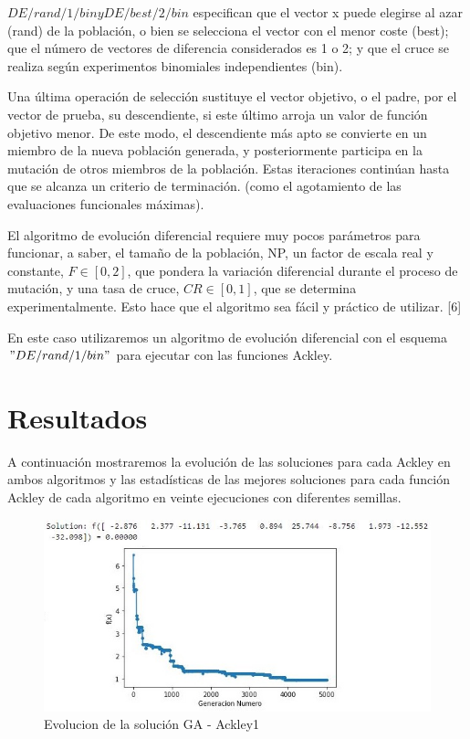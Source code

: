 \documentclass[10pt]{article}
\begin{document}
$ DE/rand/1/bin y DE/best/2/bin $ especifican que el vector x puede elegirse al azar (rand) de la población, o bien se selecciona el vector con el menor coste (best); que el número de vectores de diferencia considerados es 1 o 2; y que el cruce se realiza según experimentos binomiales independientes (bin).

Una última operación de selección sustituye el vector objetivo, o el padre, por el vector de prueba, su descendiente, si este último arroja un valor de función objetivo menor. De este modo, el descendiente más apto se convierte en un miembro de la nueva población generada, y posteriormente participa en la mutación de otros miembros de la población. Estas iteraciones continúan hasta que se alcanza un criterio de terminación. (como el agotamiento de las evaluaciones funcionales máximas).

El algoritmo de evolución diferencial requiere muy pocos parámetros para funcionar, a saber, el tamaño de la población, NP, un factor de escala real y constante, $F \in [0, 2] $, que pondera la variación diferencial durante el proceso de mutación, y una tasa de cruce, $ CR \in  [0, 1]$, que se determina experimentalmente. Esto hace que el algoritmo sea fácil y práctico de utilizar. [6]

En este caso utilizaremos un algoritmo de evolución diferencial con el esquema $ " DE/rand/1/bin " $ para ejecutar con las funciones Ackley.

\section{Resultados}%
A continuación mostraremos la evolución de las soluciones para cada Ackley en ambos algoritmos y las estadísticas de las mejores soluciones para cada función Ackley de cada algoritmo en veinte ejecuciones con diferentes semillas.

\begin{figure}[H]
\centerline{\includegraphics{ack-1-ga.jpg}}
\caption{Evolucion de la solución GA - Ackley1}
\label{fig_1}
\end{figure}
\end{document}
